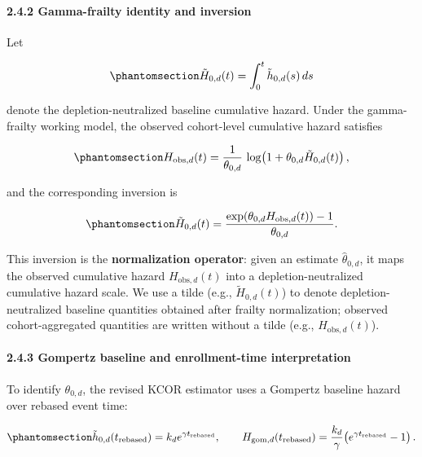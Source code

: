 \documentclass[
]{article}
\begin{document}
\paragraph{2.4.2 Gamma-frailty identity and
inversion}\label{gamma-frailty-identity-and-inversion}

Let

\begin{equation}\protect\phantomsection\label{eq:baseline-cumhazard}{
\tilde H_{0,d}(t) = \int_0^t \tilde h_{0,d}(s)\,ds
}\end{equation}

denote the depletion-neutralized baseline cumulative hazard. Under the
gamma-frailty working model, the observed cohort-level cumulative hazard
satisfies

\begin{equation}\protect\phantomsection\label{eq:gamma-frailty-identity}{
H_{\mathrm{obs},d}(t) = \frac{1}{\theta_{0,d}}\,\log\!\left(1 + \theta_{0,d} \tilde H_{0,d}(t)\right),
}\end{equation}

and the corresponding inversion is

\begin{equation}\protect\phantomsection\label{eq:gamma-frailty-inversion}{
\tilde H_{0,d}(t) = \frac{\exp\!\left(\theta_{0,d} H_{\mathrm{obs},d}(t)\right) - 1}{\theta_{0,d}}.
}\end{equation}

This inversion is the \textbf{normalization operator}: given an estimate
\(\hat{\theta}_{0,d}\), it maps the observed cumulative hazard
\(H_{\mathrm{obs},d}(t)\) into a depletion-neutralized cumulative hazard
scale. We use a tilde (e.g., \(\tilde H_{0,d}(t)\)) to denote
depletion-neutralized baseline quantities obtained after frailty
normalization; observed cohort-aggregated quantities are written without
a tilde (e.g., \(H_{\mathrm{obs},d}(t)\)).

\paragraph{2.4.3 Gompertz baseline and enrollment-time
interpretation}\label{gompertz-baseline-and-enrollment-time-interpretation}

To identify \(\theta_{0,d}\), the revised KCOR estimator uses a Gompertz
baseline hazard over rebased event time:

\begin{equation}\protect\phantomsection\label{eq:baseline-shape-default}{
\tilde h_{0,d}(t_{\mathrm{rebased}})=k_d e^{\gamma t_{\mathrm{rebased}}},
\qquad
H_{\mathrm{gom},d}(t_{\mathrm{rebased}})=\frac{k_d}{\gamma}\!\left(e^{\gamma t_{\mathrm{rebased}}}-1\right).
}\end{equation}
\end{document}

